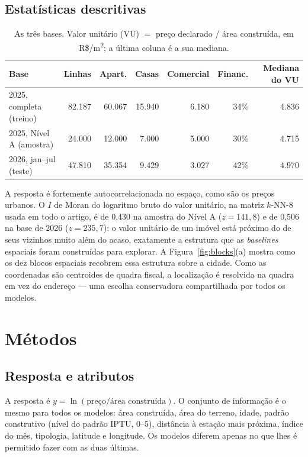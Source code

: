 \documentclass[11pt,a4paper]{article}
\newcommand{\Rsqm}{R\$/m\textsuperscript{2}}
\begin{document}
\subsection{Estatísticas descritivas}

\begin{table}[h]
\centering\small
\caption{As três bases. Valor unitário (VU) $=$ preço declarado / área construída, em \Rsqm; a última coluna é a sua mediana.}
\label{tab:data}
\footnotesize
\begin{tabular}{lrrrrrr}
\toprule
Base & Linhas & Apart. & Casas & Comercial & Financ. & Mediana do VU \\
\midrule
2025, completa (treino) & 82.187 & 60.067 & 15.940 & 6.180 & 34\% & 4.836 \\
2025, Nível A (amostra) & 24.000 & 12.000 & 7.000 & 5.000 & 30\% & 4.715 \\
2026, jan--jul (teste) & 47.810 & 35.354 & 9.429 & 3.027 & 42\% & 4.970 \\
\bottomrule
\end{tabular}
\end{table}

A resposta é fortemente autocorrelacionada no espaço, como são os preços urbanos. O $I$ de
Moran do logaritmo bruto do valor unitário, na matriz $k$-NN-8 usada em todo o artigo, é de
0,430 na amostra do Nível A ($z = 141{,}8$) e de 0,506 na base de 2026 ($z = 235{,}7$): o valor
unitário de um imóvel está próximo do de seus vizinhos muito além do acaso, exatamente a
estrutura que as \emph{baselines} espaciais foram construídas para explorar. A
Figura~\ref{fig:blocks}(a) mostra como os dez blocos espaciais recobrem essa estrutura sobre a
cidade. Como as coordenadas são centroides de quadra fiscal, a localização é resolvida na quadra em vez do endereço --- uma escolha conservadora compartilhada por todos os modelos.

\section{Métodos}
\label{sec:methods}

\subsection{Resposta e atributos}

A resposta é $y = \ln(\text{preço}/\text{área construída})$. O conjunto de informação é o mesmo
para todos os modelos: área construída, área do terreno, idade, padrão construtivo (nível do
padrão IPTU, 0--5), distância à estação mais próxima, índice do mês, tipologia, latitude e
longitude. Os modelos diferem apenas no que lhes é permitido fazer com as duas últimas.
\end{document}
